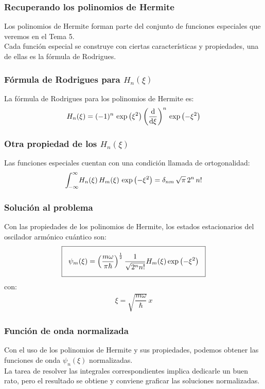\documentclass[12pt]{beamer}
\begin{document}
\begin{frame}
\frametitle{Recuperando los polinomios de Hermite}
Los polinomios de Hermite forman parte del conjunto de funciones especiales que veremos en el Tema 5.
\\
\bigskip
\pause
Cada función especial se construye con ciertas características y propiedades, una de ellas es la fórmula de Rodrigues.
\end{frame}
\begin{frame}
\frametitle{Fórmula de Rodrigues para $H_{n}(\xi)$}
La fórmula de Rodrigues para los polinomios de Hermite es:
\begin{align*}
H_{n} (\xi) = (-1)^{n} \, \exp \left( \xi^{2} \right) \left( \dv{\xi} \right)^{n} \, \exp \left( - \xi^{2} \right)
\end{align*}
\end{frame}
\begin{frame}
\frametitle{Otra propiedad de los $H_{n}(\xi)$}
Las funciones especiales cuentan con una condición llamada de ortogonalidad:
\begin{align*}
\scaleint{5ex}_{\bs - \infty}^{\infty} H_{n}(\xi) \, H_{m}(\xi) \, \exp \left( - \xi^{2} \right) = \delta_{nm} \, \sqrt{\pi} \, 2^{n} \, n!
\end{align*}
\end{frame}
\begin{frame}
\frametitle{Solución al problema}
Con las propiedades de los polinomios de Hermite, los estados estacionarios del oscilador armónico cuántico son:
\begin{align*}
\setlength{\fboxsep}{3\fboxsep}\boxed{
\psi_{m}(\xi) = \left( \dfrac{m \omega}{\pi \hbar} \right)^{\frac{1}{2}} \dfrac{1}{\sqrt{2^{n} n!}} H_{m}(\xi) \exp \left( - \xi^{2} \right) }
\end{align*}
con:
\begin{align*}
\xi = \sqrt{\dfrac{m \omega}{\hbar}} \, x
\end{align*}
\end{frame}
\begin{frame}
\frametitle{Función de onda normalizada}
Con el uso de los polinomios de Hermite y sus propiedades, podemos obtener las funciones de onda $\psi_{n} (\xi)$ normalizadas.
\\
\bigskip
\pause
La tarea de resolver las integrales correspondientes implica dedicarle un buen rato, pero el resultado se obtiene y conviene graficar las soluciones normalizadas.
\end{frame}
\end{document}

